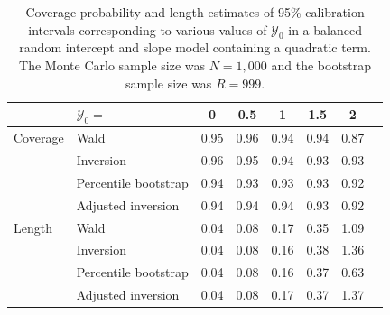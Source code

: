 \documentclass[cmfont,usenames,dvipsnames,leqno]{afit-etd}\usepackage[]{graphicx}\usepackage[]{color}
\newcommand{\mc}[1]{\ensuremath{\mathcal{#1}}}
\begin{document}
\begin{table}[!htb]
\centering
\caption[Coverage probability and length estimates for balanced a random intercept and slope model with quadratic term]{Coverage probability and length estimates of 95\% calibration intervals corresponding to various values of $\mc{Y}_0$ in a balanced random intercept and slope model containing a quadratic term. The Monte Carlo sample size was $N = 1,000$ and the bootstrap sample size was $R = 999$. \label{tab:quadratic-results}}
\begin{tabular}{llcccccc}
  \toprule
            &  $\mathcal{Y}_0 =$ & 0    & 0.5  & 1    & 1.5  & 2    \\
  \hline
  Coverage  &  Wald                 & 0.95 & 0.96 & 0.94 & 0.94 & 0.87 \\
            &  Inversion            & 0.96 & 0.95 & 0.94 & 0.93 & 0.93 \\
            &  Percentile bootstrap & 0.94 & 0.93 & 0.93 & 0.93 & 0.92 \\
						&  Adjusted inversion   & 0.94 & 0.94 & 0.94 & 0.93 & 0.92 \\
  \hline
  Length    &  Wald                 & 0.04 & 0.08 & 0.17 & 0.35 & 1.09 \\
            &  Inversion            & 0.04 & 0.08 & 0.16 & 0.38 & 1.36 \\
            &  Percentile bootstrap & 0.04 & 0.08 & 0.16 & 0.37 & 0.63 \\
						&  Adjusted inversion   & 0.04 & 0.08 & 0.17 & 0.37 & 1.37 \\
  \bottomrule
  \end{tabular}
\end{table}
\end{document}
